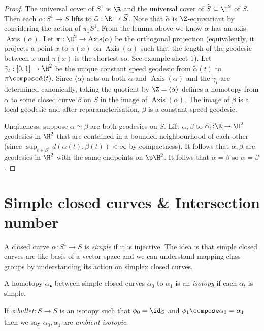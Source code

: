 \documentclass[a4paper]{article}
\renewcommand{\b}{\p}
\DeclareMathOperator{\Axis}{Axis}
\begin{document}
\begin{proof}
  The universal cover of \(S^1\) is \(\R\) and the universal cover of \(\widetilde S \subseteq \H^2\) of \(S\). Then each \(\alpha: S^1 \to S\) lifts to \(\tilde \alpha: \R \to \widetilde S\). Note that \(\tilde \alpha\) is \(\Z\)-equivariant by considering the action of \(\pi_1 S^1\). From the lemma above we know \(\alpha\) has an axis \(\Axis(\alpha)\). Let \(\pi: \H^2 \to \Axis(\alpha)\) be the orthogonal projection (equivalently, it projects a point \(x\) to \(\pi(x)\) on \(\Axis(\alpha)\) such that the length of the geodesic between \(x\) and \(\pi(x)\) is the shortest so. See example sheet 1). Let \(\tilde \gamma_t: [0, 1] \to \H^2\) be the unique constant speed geodesic from \(\tilde \alpha(t)\) to \(\pi \compose \tilde \alpha(t)\). Since \(\langle \alpha \rangle\) acts on both \(\tilde \alpha\) and \(\Axis(\alpha)\) and the \(\tilde \gamma_t\) are determined canonically, taking the quotient by \(\Z = \langle \alpha \rangle\) defines a homotopy from \(\alpha\) to some closed curve \(\beta\) on \(S\) in the image of \(\Axis(\alpha)\). The image of \(\beta\) is a local geodesic and after reparameterisation, \(\beta\) is a constant-speed geodesic.

  Unqiueness: suppose \(\alpha \simeq \beta\) are both geodesics on \(S\). Lift \(\alpha, \beta\) to \(\tilde \alpha, \tilde: \R \to \H^2\) geodesics in \(\H^2\) that are contained in a bounded neighbourhood of each other (since \(\sup_{t \in S^1} d(\alpha(t), \beta(t)) < \infty\) by compactness). It follows that \(\tilde \alpha, \tilde \beta\) are geodesics in \(\H^2\) with the same endpoints on \(\b \H^2\). It follws that \(\tilde \alpha = \tilde \beta\) so \(\alpha = \beta\).
\end{proof}

\section{Simple closed curves \& Intersection number}

A closed curve \(\alpha: S^1 \to S\) is \emph{simple} if it is injective. The idea is that simple closed curves are like basis of a vector space and we can understand mapping class groups by understanding its action on simplex closed curves.

\begin{definition}
  A homotopy \(\alpha_\bullet\) between simple closed curves \(\alpha_0\) to \(\alpha_1\) is an \emph{isotopy} if each \(\alpha_t\) is simple.

  If \(\phi_|bullet: S \to S\) is an isotopy such that \(\phi_0 = \id_S\) and \(\phi_1 \compose \alpha_0 = \alpha_1\) then we say \(\alpha_0, \alpha_1\) are \emph{ambient isotopic}.
\end{definition}
\end{document}
